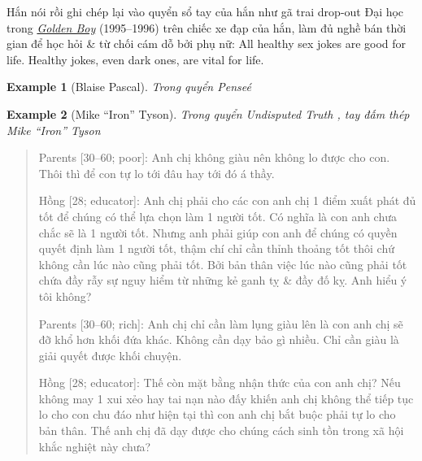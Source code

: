 \documentclass[12pt]{article}
\newtheorem{example}{Example}
\begin{document}
Hắn nói rồi ghi chép lại vào quyển sổ tay của hắn như gã trai drop-out Đại học trong \href{https://www.imdb.com/title/tt0159145/}{\it Golden Boy} (1995--1996) trên chiếc xe đạp của hắn, làm đủ nghề bán thời gian để học hỏi \& từ chối cám dỗ bởi phụ nữ: All healthy sex jokes are good for life. Healthy jokes, even dark ones, are vital for life.

\begin{example}[\sc Blaise Pascal]\rm
	Trong quyển {\it Pense\'e} \cite{Pascal_pensees}
\end{example}

\begin{example}[\sc Mike ``Iron'' Tyson]\rm
	Trong quyển {\it Undisputed Truth} \cite{Tyson_Sloman2013}, tay đấm thép Mike ``Iron'' Tyson
\end{example}

\begin{quote}
	{\sf Parents [30--60; poor]}: Anh chị không giàu nên không lo được cho con. Thôi thì để con tự lo tới đâu hay tới đó á thầy.
	
	{\sf Hồng [28; educator]}: Anh chị phải cho các con anh chị 1 điểm xuất phát đủ tốt để chúng có thể lựa chọn làm 1 người tốt. Có nghĩa là con anh chưa chắc sẽ là 1 người tốt. Nhưng anh phải giúp con anh để chúng có quyền quyết định làm 1 người tốt, thậm chí chỉ cần thỉnh thoảng tốt thôi chứ không cần lúc nào cũng phải tốt. Bởi bản thân việc lúc nào cũng phải tốt chứa đầy rẫy sự nguy hiểm từ những kẻ ganh tỵ \& đầy đố kỵ. Anh hiểu ý tôi không?
	
	{\sf Parents [30--60; rich]}: Anh chị chỉ cần làm lụng giàu lên là con anh chị sẽ đỡ khổ hơn khối đứa khác. Không cần dạy bảo gì nhiều. Chỉ cần giàu là giải quyết được khối chuyện.
	
	{\sf Hồng [28; educator]}: Thế còn mặt bằng nhận thức của con anh chị? Nếu không may 1 xui xẻo hay tai nạn nào đấy khiến anh chị không thể tiếp tục lo cho con chu đáo như hiện tại thì con anh chị bắt buộc phải tự lo cho bản thân. Thế anh chị đã dạy được cho chúng cách sinh tồn trong xã hội khắc nghiệt này chưa?
\end{quote}
\end{document}
